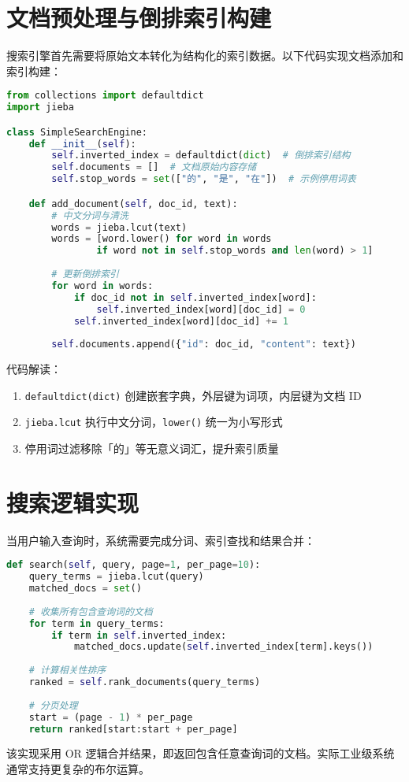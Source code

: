 \section{文档预处理与倒排索引构建}
搜索引擎首先需要将原始文本转化为结构化的索引数据。以下代码实现文档添加和索引构建：\par
\begin{lstlisting}[language=python]
from collections import defaultdict
import jieba

class SimpleSearchEngine:
    def __init__(self):
        self.inverted_index = defaultdict(dict)  # 倒排索引结构
        self.documents = []  # 文档原始内容存储
        self.stop_words = set(["的", "是", "在"])  # 示例停用词表

    def add_document(self, doc_id, text):
        # 中文分词与清洗
        words = jieba.lcut(text)
        words = [word.lower() for word in words 
                if word not in self.stop_words and len(word) > 1]
        
        # 更新倒排索引
        for word in words:
            if doc_id not in self.inverted_index[word]:
                self.inverted_index[word][doc_id] = 0
            self.inverted_index[word][doc_id] += 1
        
        self.documents.append({"id": doc_id, "content": text})
\end{lstlisting}
代码解读：\par
\begin{enumerate}
\item \verb!defaultdict(dict)! 创建嵌套字典，外层键为词项，内层键为文档 ID
\item \verb!jieba.lcut! 执行中文分词，\verb!lower()! 统一为小写形式
\item 停用词过滤移除「的」等无意义词汇，提升索引质量
\end{enumerate}
\section{搜索逻辑实现}
当用户输入查询时，系统需要完成分词、索引查找和结果合并：\par
\begin{lstlisting}[language=python]
def search(self, query, page=1, per_page=10):
    query_terms = jieba.lcut(query)
    matched_docs = set()
    
    # 收集所有包含查询词的文档
    for term in query_terms:
        if term in self.inverted_index:
            matched_docs.update(self.inverted_index[term].keys())
    
    # 计算相关性排序
    ranked = self.rank_documents(query_terms)
    
    # 分页处理
    start = (page - 1) * per_page
    return ranked[start:start + per_page]
\end{lstlisting}
该实现采用 OR 逻辑合并结果，即返回包含任意查询词的文档。实际工业级系统通常支持更复杂的布尔运算。\par

